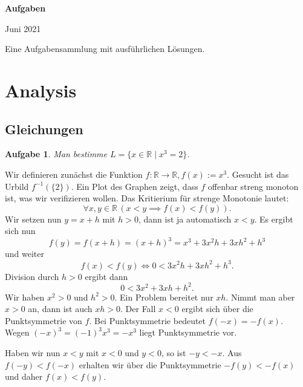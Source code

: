 \documentclass[a4paper,10pt,fleqn,twoside]{scrartcl}
\numberwithin{equation}{section}
\newcommand{\R}{\mathbb R}
\newcommand{\strong}[1]{{\normalfont\sffamily\bfseries #1}}
\theoremstyle{Aufgabe}
\newtheorem{Aufgabe}{\sffamily Aufgabe}[section]
\begin{document}
\setlength{\baselineskip}{14pt} 
\thispagestyle{empty}


\noindent
{\huge\normalfont\sffamily\bfseries Aufgaben\par}

\vspace{2mm}
\noindent Juni 2021

\vspace{2mm}
\noindent
Eine Aufgabensammlung mit ausführlichen Lösungen.

\tableofcontents

\newpage
\section{Analysis}
\subsection{Gleichungen}
\begin{Aufgabe}
Man bestimme $L=\{x\in\R\mid x^3=2\}$.
\end{Aufgabe}

\noindent\strong{Lösung.}
Wir definieren zunächst die Funktion $f\colon\R\to\R, f(x):=x^3$.
Gesucht ist das Urbild $f^{-1}(\{2\})$.
Ein Plot des Graphen zeigt, dass $f$ offenbar streng monoton ist, was
wir verifizieren wollen. Das Kritierium für strenge Monotonie lautet:
\begin{equation}
\forall x,y\in\R\,(x<y\implies f(x)<f(y)).
\end{equation}
Wir setzen nun $y=x+h$ mit $h>0$, dann ist ja automatisch $x<y$.
Es ergibt sich nun
\begin{equation}
f(y) = f(x+h) = (x+h)^3 = x^3+3x^2h+3xh^2+h^3
\end{equation}
und weiter
\begin{equation}
f(x)<f(y) \iff 0 < 3x^2 h+3xh^2+h^3.
\end{equation}
Division durch $h>0$ ergibt dann
\begin{equation}
0 < 3x^2+3xh+h^2.
\end{equation}
Wir haben $x^2>0$ und $h^2>0$. Ein Problem bereitet nur $xh$. Nimmt man
aber $x>0$ an, dann ist auch $xh>0$. Der Fall $x<0$ ergibt sich
über die Punktsymmetrie von $f$. Bei Punktsymmetrie bedeutet $f(-x)=-f(x)$.
Wegen $(-x)^3=(-1)^3x^3=-x^3$ liegt Punktsymmetrie vor.

Haben wir nun $x<y$ mit $x<0$ und $y<0$, so ist $-y<-x$. Aus
$f(-y)<f(-x)$ erhalten wir über die Punktsymmetrie $-f(y)<-f(x)$
und daher $f(x)<f(y)$.
\end{document}
